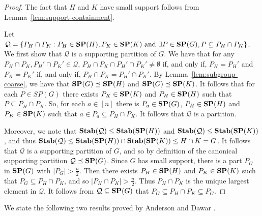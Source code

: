 \documentclass[../paper.tex]{subfiles}
\begin{document}
\begin{proof}
  The fact that $H$ and $K$ have small support follows from
  Lemma~\ref{lem:support-containment}.

  Let $\mathcal{Q} = \{P_H \cap P_K : P_H \in \text{\textbf{SP}}(H), P_K \in \text{\textbf{SP}}(K) \text{ and
  } \exists P \in \text{\textbf{SP}}(G), P \subseteq P_H \cap P_K \}$. We first show that
  $\mathcal{Q}$ is a supporting partition of $G$. We have that for any $P_H \cap
  P_K, P_H' \cap P_K' \in \mathcal{Q}$, $P_H \cap P_K \cap P_H' \cap P_K' \neq
  \emptyset$ if, and only if, $P_H = P_H'$ and $P_K = P_K'$ if, and only if,
  $P_H \cap P_K = P_H' \cap P_K'$. By Lemma~\ref{lem:subgroup-coarse}, we have
  that $\text{\textbf{SP}}(G) \preceq \text{\textbf{SP}}(H)$ and $\text{\textbf{SP}}(G) \preceq \text{\textbf{SP}}(K)$. It follows that for
  each $P \in SP(G)$ there exists $P_K \in \text{\textbf{SP}}(K)$ and $P_H \in \text{\textbf{SP}}(H)$ such
  that $P \subseteq P_H \cap P_K$. So, for each $a \in [n]$ there is $P_a \in
  \text{\textbf{SP}}(G)$, $P_H \in \text{\textbf{SP}}(H)$ and $P_K \in \text{\textbf{SP}}(K)$ such that $a \in P_a \subseteq
  P_H \cap P_K$. It follows that $\mathcal{Q}$ is a partition.

  Moreover, we note that $\text{\textbf{Stab}}(\mathcal{Q}) \leq \text{\textbf{Stab}}(\text{\textbf{SP}}(H))$ and
  $\text{\textbf{Stab}}(\mathcal{Q}) \leq \text{\textbf{Stab}}(\text{\textbf{SP}}(K))$, and thus $\text{\textbf{Stab}}(\mathcal{Q}) \leq
  \text{\textbf{Stab}}(\text{\textbf{SP}}(H)) \cap \text{\textbf{Stab}}(\text{\textbf{SP}}(K)) \leq H \cap K = G$. It follows that
  $\mathcal{Q}$ is a supporting partition of $G$, and so by definition of the
  canonical supporting partition $\mathcal{Q} \preceq \text{\textbf{SP}} (G)$. Since $G$ has
  small support, there is a part $P_G$ in $\text{\textbf{SP}}(G)$ with $|P_G| > \frac{n}{2}$.
  Then there exists $P_H \in \text{\textbf{SP}}(H)$ and $P_K \in \text{\textbf{SP}}(K)$ such that $P_G
  \subseteq P_H \cap P_K$, and so $\vert P_H \cap P_K \vert > \frac{n}{2}$. Thus
  $P_H \cap P_K$ is the unique largest element in $\mathcal{Q}$. It follows from
  $\mathcal{Q} \subseteq \text{\textbf{SP}}(G)$ that $P_G \subseteq P_H \cap P_K \subseteq
  P_G$.



\end{proof}

We state the following two results proved by Anderson and Dawar
\cite{AndersonD17}.
\end{document}
